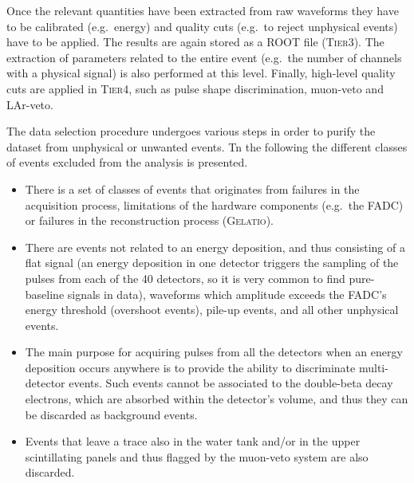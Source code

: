 Once the relevant quantities have been extracted from raw waveforms they have to be calibrated (e.g.~energy) and quality cuts (e.g.~to reject unphysical events) have to be applied. The results are again stored as a ROOT file (\textsc{Tier3}). The extraction of parameters related to the entire event (e.g.~the number of channels with a physical signal) is also performed at this level. Finally, high-level quality cuts are applied in \textsc{Tier4}, such as pulse shape discrimination, muon-veto and LAr-veto.

 The data selection procedure undergoes various steps in order to purify the dataset from unphysical or unwanted events. Tn the following the different classes of events excluded from the analysis is presented.
\begin{itemize}
	\item There is a set of classes of events that originates from failures in the acquisition process, limitations of the hardware components (e.g.~the FADC) or failures in the reconstruction process (\textsc{Gelatio}).
	\item There are events not related to an energy deposition, and thus consisting of a flat signal (an energy deposition in one detector triggers the sampling of the pulses from each of the 40 detectors, so it is very common to find pure-baseline signals in data), waveforms which amplitude exceeds the FADC's energy threshold (overshoot events), pile-up events, and all other unphysical events.
	\item The main purpose for acquiring pulses from all the detectors when an energy deposition occurs anywhere is to provide the ability to discriminate multi-detector events. Such events cannot be associated to the double-beta decay electrons, which are absorbed within the detector's volume, and thus they can be discarded as background events.
	\item Events that leave a trace also in the water tank and/or in the upper scintillating panels and thus flagged by the muon-veto system are also discarded.
\end{itemize}

